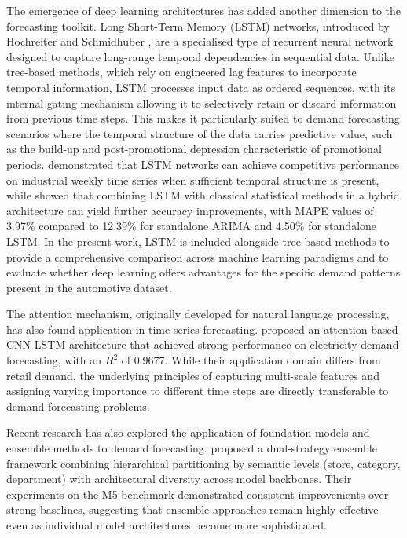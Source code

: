\documentclass[ENG]{TFUOC}%
\begin{document}
The emergence of deep learning architectures has added another dimension to the forecasting toolkit. Long Short-Term Memory (LSTM) networks, introduced by Hochreiter and Schmidhuber \citep{hochreiter1997lstm}, are a specialised type of recurrent neural network designed to capture long-range temporal dependencies in sequential data. Unlike tree-based methods, which rely on engineered lag features to incorporate temporal information, LSTM processes input data as ordered sequences, with its internal gating mechanism allowing it to selectively retain or discard information from previous time steps. This makes it particularly suited to demand forecasting scenarios where the temporal structure of the data carries predictive value, such as the build-up and post-promotional depression characteristic of promotional periods. \citet{barath2026lstm} demonstrated that LSTM networks can achieve competitive performance on industrial weekly time series when sufficient temporal structure is present, while \citet{mardotillah2025hybrid} showed that combining LSTM with classical statistical methods in a hybrid architecture can yield further accuracy improvements, with MAPE values of 3.97\%   compared to 12.39\%  for standalone ARIMA and 4.50\%  for standalone LSTM. In the present work, LSTM is included alongside tree-based methods to provide a comprehensive comparison across machine learning paradigms and to evaluate whether deep learning offers advantages for the specific demand patterns present in the automotive dataset.

The attention mechanism, originally developed for natural language processing, has also found application in time series forecasting. \citet{debnath2026hybrid} proposed an attention-based CNN-LSTM architecture that achieved strong performance on electricity demand forecasting, with an $R^2$ of 0.9677. While their application domain differs from retail demand, the underlying principles of capturing multi-scale features and assigning varying importance to different time steps are directly transferable to demand forecasting problems.

Recent research has also explored the application of foundation models and ensemble methods to demand forecasting. \citet{yang2025foundation} proposed a dual-strategy ensemble framework combining hierarchical partitioning by semantic levels (store, category, department) with architectural diversity across model backbones. Their experiments on the M5 benchmark demonstrated consistent improvements over strong baselines, suggesting that ensemble approaches remain highly effective even as individual model architectures become more sophisticated.
\end{document}
